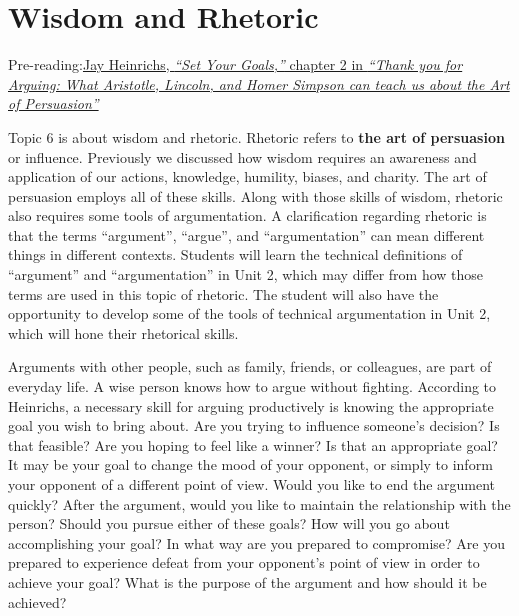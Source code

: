 \documentclass[
]{book}
\begin{document}
\hypertarget{wisdom-and-rhetoric}{%
\section{Wisdom and Rhetoric}\label{wisdom-and-rhetoric}}

\begin{reflect}
Pre-reading:\href{assets/u1/PAT-10018663_Thank_you_for.pdf}{Jay Heinrichs, \emph{``Set Your Goals,''} chapter 2 in \emph{``Thank you for Arguing: What Aristotle, Lincoln, and Homer Simpson can teach us about the Art of Persuasion''}}
\end{reflect}

Topic 6 is about wisdom and rhetoric. Rhetoric refers to \textbf{the art of persuasion} or influence. Previously we discussed how wisdom requires an awareness and application of our actions, knowledge, humility, biases, and charity. The art of persuasion employs all of these skills. Along with those skills of wisdom, rhetoric also requires some tools of argumentation. A clarification regarding rhetoric is that the terms ``argument'', ``argue'', and ``argumentation'' can mean different things in different contexts. Students will learn the technical definitions of ``argument'' and ``argumentation'' in Unit 2, which may differ from how those terms are used in this topic of rhetoric. The student will also have the opportunity to develop some of the tools of technical argumentation in Unit 2, which will hone their rhetorical skills.

Arguments with other people, such as family, friends, or colleagues, are part of everyday life. A wise person knows how to argue without fighting. According to Heinrichs, a necessary skill for arguing productively is knowing the appropriate goal you wish to bring about. Are you trying to influence someone's decision? Is that feasible? Are you hoping to feel like a winner? Is that an appropriate goal? It may be your goal to change the mood of your opponent, or simply to inform your opponent of a different point of view. Would you like to end the argument quickly? After the argument, would you like to maintain the relationship with the person? Should you pursue either of these goals? How will you go about accomplishing your goal? In what way are you prepared to compromise? Are you prepared to experience defeat from your opponent's point of view in order to achieve your goal? What is the purpose of the argument and how should it be achieved?
\end{document}
